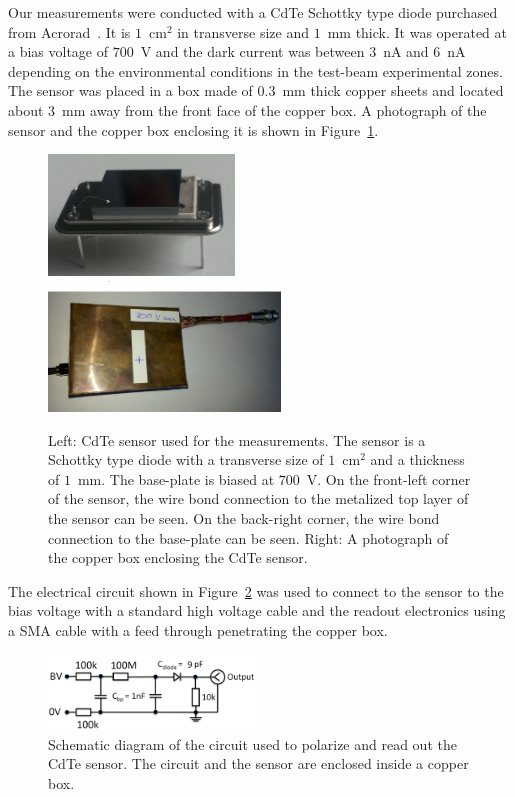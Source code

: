 %
Our measurements were conducted with a CdTe Schottky type diode purchased from 
Acrorad~\cite{acrorad}. It is $1$~$\mathrm{cm}^{2}$ in transverse size and $1$~mm thick.
It was operated at a bias voltage of $700$~V and the dark current was between $3$~nA 
and $6$~nA depending on the environmental conditions in the test-beam experimental 
zones. The sensor was placed in a box made of $0.3$~mm thick copper sheets and located
about $3$~mm away from the front face of the copper box.
A photograph of the sensor and the copper box enclosing it is shown in 
Figure~\ref{fig:CdTeSensor}.

%
\begin{figure}[htbp] 
\centering
\includegraphics[width=0.44\textwidth]{figures/CdTeSensor.png} 
\includegraphics[width=0.55\textwidth]{figures/CdTeSensorBox.png} 
\caption{Left: CdTe sensor used for the measurements. The sensor is a Schottky type diode with a transverse size 
of $1$~$\mathrm{cm}^{2}$ and a thickness of $1$~mm. The base-plate is biased at $700$~V. 
On the front-left corner of the sensor, the wire bond connection
to the metalized top layer of the sensor can be seen. On the back-right corner,
the wire bond connection to the base-plate can be seen. 
Right: A photograph of the copper box enclosing the CdTe sensor. } 
\label{fig:CdTeSensor} 
\end{figure} 
%
The electrical circuit shown in Figure~\ref{fig:cdtecircuit} was used to connect to the sensor to the bias 
voltage with a standard high voltage cable and the readout electronics using a SMA cable with a feed 
through penetrating the copper box.

%
\begin{figure}[htbp] 
\centering
\includegraphics[width=0.49\textwidth]{figures/circuit_CdTe.png} 
\caption{Schematic diagram of the circuit used to polarize and read out the 
CdTe sensor. The circuit and the sensor are enclosed inside a copper box. }
\label{fig:cdtecircuit} 
\end{figure} 
%
